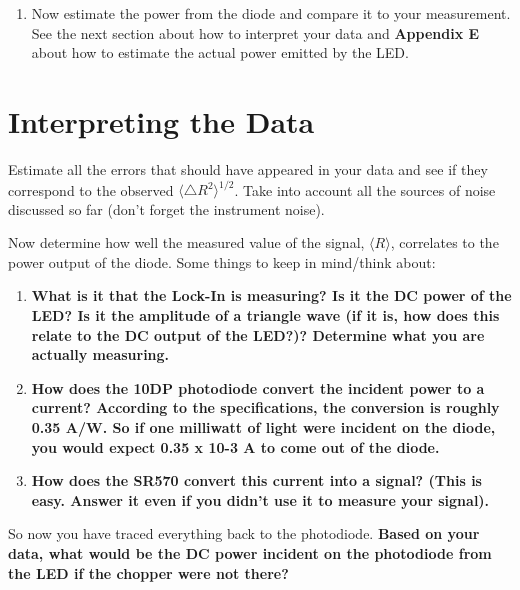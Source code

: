 \documentclass{../lab}
\begin{document}
\begin{enumerate}
    \item Now estimate the power from the diode and compare it to your measurement. See the next section about how to interpret your data and \textbf{Appendix E} about how to estimate the actual power emitted by the LED.

\end{enumerate}

\section{Interpreting the Data}

Estimate all the errors that should have appeared in your data and see if they correspond to the observed $\langle \triangle R^2 \rangle^{1/2}$. Take into account all the sources of noise discussed so far (don't forget the instrument noise).

Now determine how well the measured value of the signal, $\langle  R \rangle$, correlates to the power output of the diode. Some things to keep in mind/think about:

\begin{enumerate}
    \item \textbf{What is it that the Lock-In is measuring? Is it the DC power of the LED? Is it the amplitude of a triangle wave (if it is, how does this relate to the DC output of the LED?)? Determine what you are actually measuring.}

    \item \textbf{How does the 10DP photodiode convert the incident power to a current? According to the specifications, the conversion is roughly 0.35 A/W. So if one milliwatt of light were incident on the diode, you would expect 0.35 x 10-3 A to come out of the diode. }

    \item \textbf{How does the SR570 convert this current into a signal? (This is easy. Answer it even if you didn't use it to measure your signal).}

\end{enumerate}

So now you have traced everything back to the photodiode. \textbf{Based on your data, what would be the DC power incident on the photodiode from the LED if the chopper were not there?}
\end{document}
